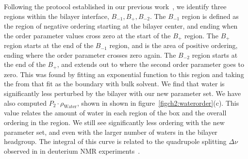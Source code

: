 Following the protocol established in our previous work~\cite{saunders:2019}, 
we identify three regions within the bilayer interface, $B_{-1}, B_{+}, B_{-2}$. 
The $B_{-1}$ region is defined as the region of negative ordering starting at the bilayer center, and ending 
    when the order parameter values cross zero at the start of the $B_{+}$ 
    region. The $B_{+}$ region starts at the end of the $B_{-1}$ region, and 
    is the area of positive ordering, ending where the order parameter crosses
    zero again. The $B_{-2}$ region starts at the end of the $B_{+}$, and extends out to where the 
    second order parameter goes to zero. This was found by fitting an exponential function to this region 
    and taking the  from that fit as the boundary with bulk solvent.
We find that water is significantly less perturbed by the bilayer with our new parameter set.  
We have also computed $P_2\cdot\rho_{\text{Water}}$, shown in shown in figure~\ref{figch2:waterorder}(c). 
This value relates the amount of water in each region of the box and 
the overall ordering in the region. 
We still see significantly less ordering with the new parameter set, 
and even with the larger number of waters in the bilayer headgroup. 
The integral of this curve is related to the quadrupole splitting $\Delta \nu$ observed in
in deuterium NMR experiments~\cite{aaman:2003,kruczek:2017}.

